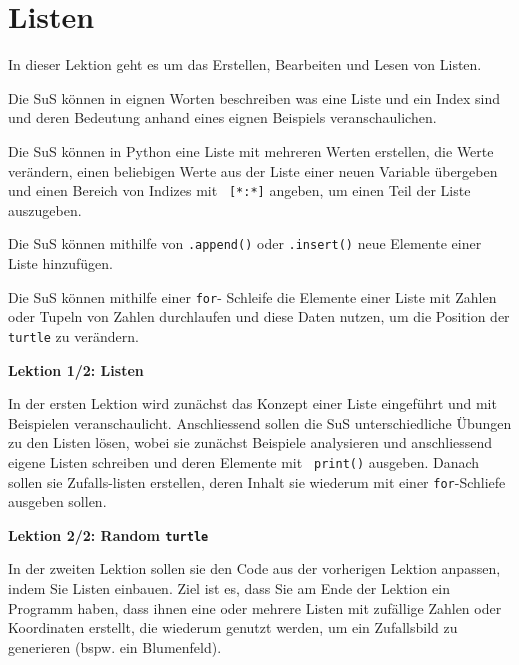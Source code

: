 \section{Listen}
\begin{myExBox}
	In dieser Lektion geht es um das Erstellen, Bearbeiten und Lesen von Listen.

	\begin{todolist}
		\item Die SuS können in eignen Worten beschreiben was eine Liste und ein Index sind und deren Bedeutung anhand eines eignen Beispiels veranschaulichen.
		\item Die SuS können in Python eine Liste mit mehreren Werten erstellen, die Werte verändern, einen beliebigen Werte aus der Liste einer neuen Variable übergeben und einen Bereich von Indizes mit \lstinline| [*:*]| angeben, um einen Teil der Liste auszugeben.
		\item Die SuS können mithilfe von \lstinline|.append()| oder \lstinline|.insert()| neue Elemente einer Liste hinzufügen.
		\item Die SuS können mithilfe einer \lstinline|for|-  Schleife die Elemente einer Liste mit Zahlen oder Tupeln von Zahlen durchlaufen und diese Daten nutzen, um die Position der \lstinline|turtle| zu verändern.
	\end{todolist}

	\textbf{Lektion 1/2: Listen}

	In der ersten Lektion wird zunächst das Konzept einer Liste eingeführt und mit Beispielen veranschaulicht. Anschliessend sollen die SuS unterschiedliche Übungen zu den Listen lösen, wobei sie zunächst Beispiele analysieren und anschliessend eigene Listen schreiben und deren Elemente mit \lstinline| print()| ausgeben. Danach sollen sie Zufalls-listen erstellen, deren Inhalt sie wiederum mit einer \lstinline|for|-Schliefe ausgeben sollen.

	\textbf{Lektion 2/2: Random \lstinline|turtle|}

	In der zweiten Lektion sollen sie den Code aus der vorherigen Lektion anpassen, indem Sie Listen einbauen. Ziel ist es, dass Sie am Ende der Lektion ein Programm haben, dass ihnen eine oder mehrere Listen mit zufällige Zahlen oder Koordinaten erstellt, die wiederum genutzt werden, um ein Zufallsbild zu generieren (bspw. ein Blumenfeld).


\end{myExBox}
